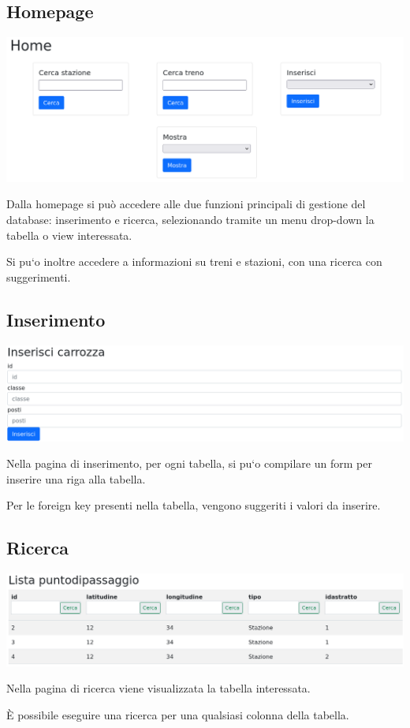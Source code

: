 \documentclass[a4paper,12pt]{report}
\begin{document}
	\subsection{Homepage}
	\includegraphics[width=\linewidth]{res/screenshots/home.png}
	\par Dalla homepage si pu\`o accedere alle due funzioni principali di gestione del database: inserimento e ricerca,
	selezionando tramite un menu drop-down la tabella o view interessata.
	\par Si pu`o inoltre accedere a informazioni su treni e stazioni, con una ricerca con suggerimenti.
	\subsection{Inserimento}
	\includegraphics[width=\linewidth]{res/screenshots/inserisci.png}
	\par Nella pagina di inserimento, per ogni tabella, si pu`o compilare un form per inserire una riga alla tabella.
	\par Per le foreign key presenti nella tabella, vengono suggeriti i valori da inserire.
	\subsection{Ricerca}
	\includegraphics[width=\linewidth]{res/screenshots/lista.png}
	\par Nella pagina di ricerca viene visualizzata la tabella interessata.
	\par \`E possibile eseguire una ricerca per una qualsiasi colonna della tabella.
\end{document}
